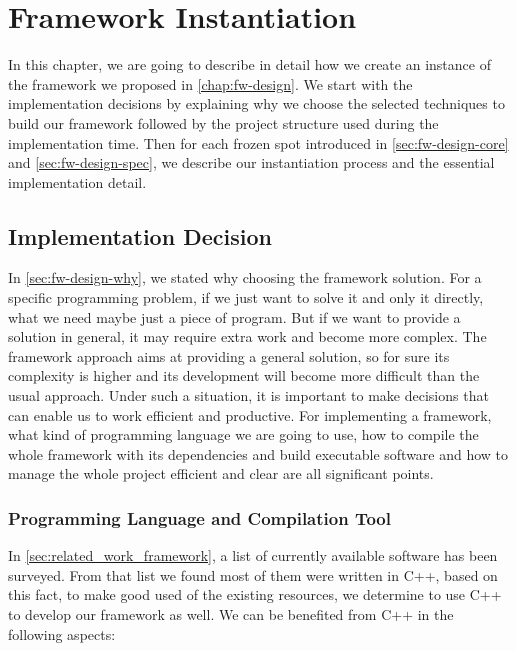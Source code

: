 \chapter{Framework Instantiation}
\label{chap:fw-inst}


In this chapter, we are going to describe in detail how we create an instance
of the framework we proposed in \autoref{chap:fw-design}. We start with the
implementation decisions by explaining why we choose the selected techniques to
build our framework followed by the project structure used during the
implementation time.
Then for each frozen spot introduced in \autoref{sec:fw-design-core} and
\autoref{sec:fw-design-spec}, we describe our instantiation process and the
essential implementation detail.


\section{Implementation Decision}
\label{sec:fw-inst-impl}

In \autoref{sec:fw-design-why}, we stated why choosing the framework
solution. For a specific programming problem, if we just want to solve it and
only it directly, what we need maybe just a piece of program. But if we want to
provide a solution in general, it may require extra work and become more
complex. The framework approach aims at providing a general solution, so for
sure its complexity is higher and its development will become more difficult
than the usual approach.
Under such a situation, it is important to make decisions that can enable us to
work efficient and productive. For implementing a framework, what kind of
programming language we are going to use, how to compile the whole framework
with its dependencies and build executable software and how to manage the whole
project efficient and clear are all significant points.

\subsection{Programming Language and Compilation Tool}
\label{sec:fw-inst-lang-ct}

In \autoref{sec:related_work_framework}, a list of currently available software
has been surveyed. From that list we found most of them were written in C++, based
on this fact, to make good used of the existing resources, we
determine to use C++ to develop our framework as well. We can be benefited from
C++ in the following aspects:

